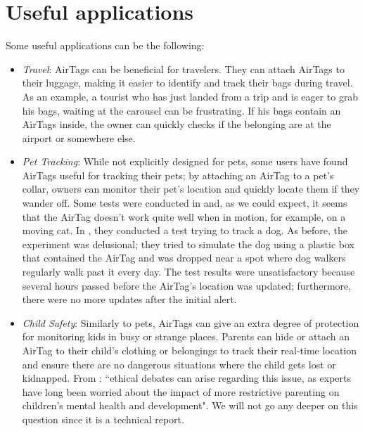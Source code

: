 \documentclass[english]{article}
\begin{document}
\section{Useful applications}\label{appl}
Some useful applications can be the following:
\begin{itemize}
  \item \textit{Travel}: AirTags can be beneficial for travelers. They can attach AirTags to their luggage, making it easier to identify and track their bags during travel. As an example, a tourist who has just landed from a trip and is eager to grab his bags, waiting at the carousel can be frustrating. If his bags contain an AirTags inside, the owner can quickly checks if the belonging are at the airport or somewhere else. 
  \item \textit{Pet Tracking}: While not explicitly designed for pets, some users have found AirTags useful for tracking their pets; by attaching an AirTag to a pet's collar, owners can monitor their pet's location and quickly locate them if they wander off. Some tests were conducted in \cite{KittyCatGO2024} and, as we could expect, it seems that the AirTag doesn’t work quite well when in motion, for example, on a moving cat. In \cite{Src2024}, they conducted a test trying to track a dog. As before, the experiment was delusional; they tried to simulate the dog using a plastic box that contained the AirTag and was dropped near a spot where dog walkers regularly walk past it every day. 
  The test results were unsatisfactory because several hours passed before the AirTag's location was updated; furthermore, there were no more updates after the initial alert.
  \item \textit{Child Safety}: Similarly to pets, AirTags can give an extra degree of protection for monitoring kids in busy or strange places. Parents can hide or attach an AirTag to their child's clothing or belongings to track their real-time location and ensure there are no dangerous situations where the child gets lost or kidnapped. From \cite{Kelly_2023}: ``ethical debates can arise regarding this issue, as experts have long been worried about the impact of more restrictive parenting on children’s mental health and development". We will not go any deeper on this question since it is a technical report.

\end{itemize}
\end{document}

